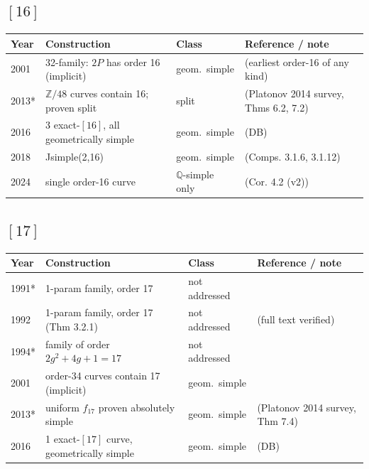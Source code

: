 \documentclass[10pt]{amsart}
\begin{document}
\subsection*{$[16]$}
\begin{longtable}{p{0.9cm} p{7.6cm} p{2.3cm} p{4.2cm}}
\hline Year & Construction & Class & Reference / note \\ \hline
2001 & 32-family: $2P$ has order 16 (implicit) & geom.\ simple & \cite{Elkies2002} (earliest order-16 of any kind)\\
2013* & $\mathbb{Z}/48$ curves contain 16; proven split & split & \cite{PZP2013} (Platonov 2014 survey, Thms 6.2, 7.2)\\
2016 & 3 exact-$[16]$, all geometrically simple & geom.\ simple & \cite{BSSVY} (DB)\\
2018 & Jsimple(2,16) & geom.\ simple & \cite{Nicholls2018} (Comps. 3.1.6, 3.1.12)\\
2024 & single order-16 curve & $\mathbb{Q}$-simple only & \cite{SadekSuluyer2024} (Cor. 4.2 (v2))\\
\hline\end{longtable}
\subsection*{$[17]$}
\begin{longtable}{p{0.9cm} p{7.6cm} p{2.3cm} p{4.2cm}}
\hline Year & Construction & Class & Reference / note \\ \hline
1991* & 1-param family, order 17 & not addressed & \cite{Leprevost1991b}\\
1992 & 1-param family, order 17 (Thm 3.2.1) & not addressed & \cite{Leprevost1992} (full text verified)\\
1994* & family of order $2g^2{+}4g{+}1 = 17$ & not addressed & \cite{Leprevost1994}\\
2001 & order-34 curves contain 17 (implicit) & geom.\ simple & \cite{Elkies2002}\\
2013* & uniform $f_{17}$ proven absolutely simple & geom.\ simple & \cite{PZP2013} (Platonov 2014 survey, Thm 7.4)\\
2016 & 1 exact-$[17]$ curve, geometrically simple & geom.\ simple & \cite{BSSVY} (DB)\\
\hline\end{longtable}
\end{document}
